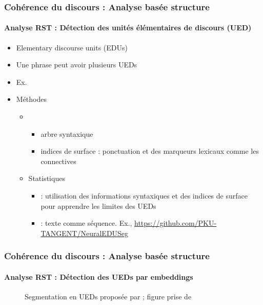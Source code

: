\documentclass[xcolor=table]{beamer}
\begin{document}
\begin{frame}
	\frametitle{Cohérence du discours : Analyse basée structure}
	\framesubtitle{Analyse RST : Détection des unités élémentaires de discours (UED)}
	
	\begin{itemize}
		\item Elementary discourse units (EDUs)
		\item Une phrase peut avoir plusieurs UEDs 
		\item Ex. 
		\item Méthodes 
		\begin{itemize}
			\item {}
			\begin{itemize}
				\item arbre syntaxique
				\item indices de surface : ponctuation et des marqueurs lexicaux comme les connectives
			\end{itemize}
			\item Statistiques 
			\begin{itemize}
				\item {} : utilisation des informations syntaxiques et des indices de surface pour apprendre les limites des UEDs
				\item {} : texte comme séquence. Ex., \url{https://github.com/PKU-TANGENT/NeuralEDUSeg}
			\end{itemize}
		\end{itemize}
	\end{itemize}
	
\end{frame}

\begin{frame}
	\frametitle{Cohérence du discours : Analyse basée structure}
	\framesubtitle{Analyse RST : Détection des UEDs par embeddings}
	
	\begin{figure}
		\centering
		\caption{Segmentation en UEDs proposée par \cite{2018-wang-al} ; figure prise de \cite{2019-jurafsky-martin}}
	\end{figure}
	
\end{frame}
\end{document}
